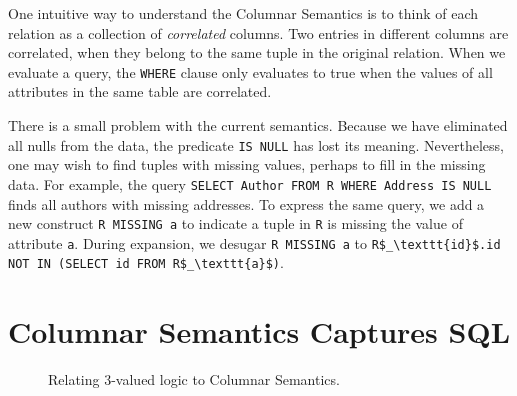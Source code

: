 \documentclass[sigconf,nonacm]{acmart}
\begin{document}
One intuitive way to understand the Columnar Semantics 
 is to think of each relation as a collection of {\em correlated} columns.
Two entries in different columns are correlated, 
 when they belong to the same tuple in the original relation.
When we evaluate a query, the \lstinline|WHERE| clause 
 only evaluates to true when the values of all attributes
 in the same table are correlated.

There is a small problem with the current semantics.
Because we have eliminated all nulls from the data, 
 the predicate \lstinline|IS NULL| has lost its meaning.
Nevertheless, one may wish to find tuples with missing values,
 perhaps to fill in the missing data.
For example, the query 
\lstinline|SELECT Author FROM R WHERE Address IS NULL|
finds all authors with missing addresses.
To express the same query, 
 we add a new construct \lstinline|R MISSING a|
 to indicate a tuple in \lstinline|R|
 is missing the value of attribute \lstinline|a|.
During expansion, we desugar \lstinline|R MISSING a|
 to \lstinline|R$_\texttt{id}$.id NOT IN (SELECT id FROM R$_\texttt{a}$)|.

\section{Columnar Semantics Captures SQL}
\label{sec:cv3}

\begin{figure}
\begin{subfigure}{0.49\linewidth}
\centering
{}
\end{subfigure}
\begin{subfigure}{0.49\linewidth}
\centering
{}
\end{subfigure}
\caption{Relating 3-valued logic to Columnar Semantics.}
\label{fig:3vl-cs}
\end{figure}
\end{document}
